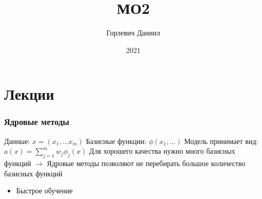 \documentclass[a4paper, 12pt]{article}
\author{Горлевич Даниил}
\title{МО2}
\date{2021}
\begin{document}
\maketitle

\tableofcontents

\part{Лекции}

\section{Ядровые методы}

Данные: $x = (x_{1}, ... x_{m})$
\newline
Базисные функции: $\phi(x_{1}, ...)$
\newline
Модель принимает вид: $a(x) = \sum_{j = 1}^{m}w_{j}\phi_{j}(x)$
\newline
Для хорошего качества нужно много базисных функций $\rightarrow$ Ядровые методы позволяют не перебирать большое количество базисных функций

\begin{itemize}
    \item Быстрое обучение
\end{itemize}
\end{document}
